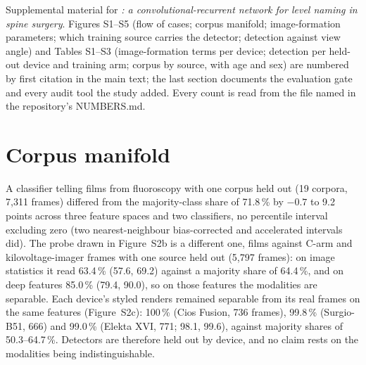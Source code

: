 \setlength{\emergencystretch}{2em}
\singlespacing
\maketitle

\renewcommand{\thetable}{S\arabic{table}}
Supplemental material for \emph{\netname{}: a convolutional-recurrent network for level naming in spine surgery}. Figures S1--S5 (flow of cases; corpus manifold; image-formation parameters; which training source carries the detector; detection against view angle) and Tables S1--S3 (image-formation terms per device; detection per held-out device and training arm; corpus by source, with age and sex) are numbered by first citation in the main text; the last section documents the evaluation gate and every audit tool the study added. Every count is read from the file named in the repository's NUMBERS.md.

\section*{Corpus manifold}
A classifier telling films from fluoroscopy with one corpus held out (19 corpora, 7,311 frames) differed from the
majority-class share of 71.8\,\% by $-0.7$ to 9.2 points across three feature spaces and two classifiers, no
percentile interval excluding zero (two nearest-neighbour bias-corrected and accelerated intervals did). The
probe drawn in Figure~S2b is a different one, films against C-arm and kilovoltage-imager frames with one source
held out (5,797 frames): on image statistics it read 63.4\,\% (57.6, 69.2) against a majority share of 64.4\,\%,
and on deep features 85.0\,\% (79.4, 90.0), so on those features the modalities are separable. Each device's styled
renders remained separable from its real frames on the same features (Figure~S2c): 100\,\% (Cios Fusion, 736 frames),
99.8\,\% (Surgio-B51, 666) and 99.0\,\% (Elekta XVI, 771; 98.1, 99.6), against majority shares of 50.3--64.7\,\%.
Detectors are therefore held out by device, and no claim rests on the modalities being indistinguishable.

